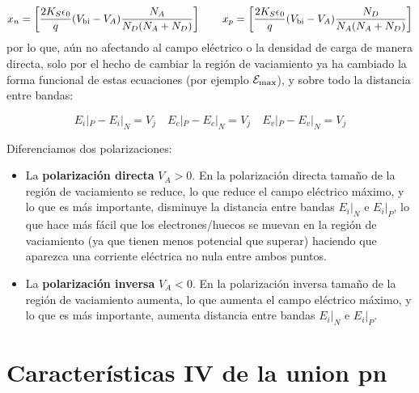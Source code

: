 \begin{equation}
    x_n = \left[ \frac{2K_S\epsilon_0 }{q} (V_{\text{bi}} - V_A) \frac{N_A}{N_D(N_A+N_D)} \right] \qquad 
    x_p = \left[ \frac{2K_S\epsilon_0 }{q} (V_{\text{bi}} - V_A) \frac{N_D}{N_A(N_A+N_D)} \right]
\end{equation}
por lo que, aún no afectando al campo eléctrico o la densidad de carga de manera directa, solo por el hecho de cambiar la región de vaciamiento ya ha cambiado la forma funcional de estas ecuaciones (por ejemplo $\mathcal{E}_{\max}$), y sobre todo la distancia entre bandas:

\begin{equation}
    E_i|_P-E_i|_N=V_j \quad  E_c|_P-E_c|_N=V_j \quad  E_v|_P-E_v|_N=V_j
\end{equation}

Diferenciamos dos polarizaciones: 

\begin{itemize}
    \item La \textbf{polarización directa} $V_A>0$. En la polarización directa tamaño de la región de vaciamiento se reduce, lo que reduce el campo eléctrico máximo, y lo que es más importante, disminuye la distancia entre bandas $E_i|_N$ e $E_i|_P$, lo que hace más fácil que los electrones/huecos se muevan en la región de vaciamiento (ya que tienen menos potencial que superar) haciendo que aparezca una corriente eléctrica no nula entre ambos puntos. 
    \item La \textbf{polarización inversa} $V_A<0$. En la polarización inversa tamaño de la región de vaciamiento aumenta, lo que aumenta el campo eléctrico máximo, y lo que es más importante, aumenta distancia entre bandas $E_i|_N$ e $E_i|_P$.
\end{itemize}






\section{Características IV de la union pn}

